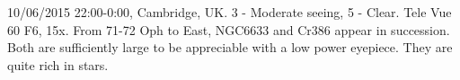 \item 10/06/2015 22:00-0:00, Cambridge, UK. 3 - Moderate seeing, 5 - Clear. Tele Vue 60 F6, 15x. From 71-72 Oph to East, NGC6633 and Cr386 appear in succession. Both are sufficiently large to be appreciable with a low power eyepiece. They are quite rich in stars. 
